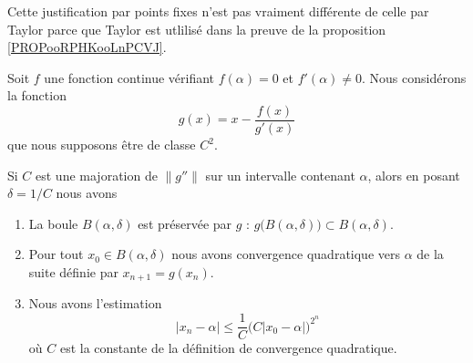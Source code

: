 \begin{remark}
    Cette justification par points fixes n'est pas vraiment différente de celle par Taylor parce que Taylor est utlilisé dans la preuve de la proposition \ref{PROPooRPHKooLnPCVJ}.
\end{remark}

\begin{theorem}       \label{THOooDOVSooWsAFkx}
    Soit \( f\) une fonction continue vérifiant \( f(\alpha)=0\) et \( f'(\alpha)\neq 0\). Nous considérons la fonction
    \begin{equation}
        g(x)=x-\frac{ f(x) }{ g'(x) }
    \end{equation}
    que nous supposons être de classe \( C^2\).

    Si \( C\) est une majoration de \( \| g'' \|\) sur un intervalle contenant \( \alpha\), alors en posant \( \delta=1/C\) nous avons 
    \begin{enumerate}
        \item       \label{ITEMooVXSKooWCVWQc}
            La boule \( B(\alpha,\delta)\) est préservée par \( g\) : \( g\big( B(\alpha,\delta) \big)\subset B(\alpha,\delta)\).
        \item       \label{ITEMooZPSXooGgbfhG}
            Pour tout \( x_0\in B(\alpha,\delta)\) nous avons convergence quadratique vers \( \alpha\) de la suite définie par \( x_{n+1}=g(x_n)\).
        \item       \label{ITEMooZCXZooCjeWPl}
            Nous avons l'estimation
            \begin{equation}        \label{EQooFAIPooDpoNWK}
                | x_n-\alpha |\leq \frac{1}{ C }\big( C| x_0-\alpha | \big)^{2^n}
            \end{equation}
            où \( C\) est la constante de la définition de convergence quadratique.
    \end{enumerate}
\end{theorem}

